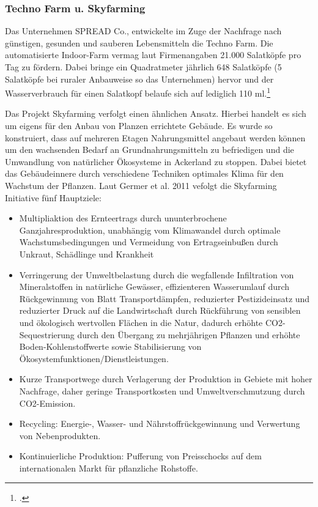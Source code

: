 \documentclass{scrartcl}
\begin{document}
\subsubsection{Techno Farm u. Skyfarming}

Das Unternehmen SPREAD Co., entwickelte im Zuge der Nachfrage nach günstigen, gesunden und sauberen Lebensmitteln die Techno Farm. Die automatisierte Indoor-Farm vermag laut Firmenangaben 21.000 Salatköpfe pro Tag zu fördern. Dabei bringe ein Quadratmeter jährlich 648 Salatköpfe (5 Salatköpfe bei ruraler Anbauweise so das Unternehmen) hervor und der Wasserverbrauch für einen Salatkopf belaufe sich auf lediglich 110 ml.\footcite[Vgl.]{TechnoFarm}

Das Projekt Skyfarming verfolgt einen ähnlichen Ansatz. Hierbei handelt es sich um eigens für den Anbau von Planzen errichtete Gebäude. Es wurde so konstruiert, dass auf mehreren Etagen Nahrungsmittel angebaut werden können um den wachsenden Bedarf an Grundnahrungsmitteln zu befriedigen und die Umwandlung von natürlicher Ökosysteme in Ackerland zu stoppen. Dabei bietet das Gebäudeinnere durch verschiedene Techniken optimales Klima für den Wachstum der Pflanzen. Laut Germer et al. 2011 vefolgt die Skyfarming Initiative fünf Hauptziele:

\begin{itemize}
    \item Multipliaktion des Ernteertrags durch ununterbrochene Ganzjahresproduktion, unabhängig vom Klimawandel durch optimale  Wachstumsbedingungen und Vermeidung von Ertragseinbußen durch Unkraut, Schädlinge und Krankheit
    \item Verringerung der Umweltbelastung durch die wegfallende Infiltration von Mineralstoffen in natürliche Gewässer, effizienteren Wasserumlauf durch Rückgewinnung von Blatt Transportdämpfen, reduzierter Pestizideinsatz und reduzierter Druck auf die Landwirtschaft durch Rückführung von sensiblen und ökologisch wertvollen Flächen in die Natur, dadurch erhöhte CO2-Sequestrierung durch den Übergang zu mehrjährigen Pflanzen und erhöhte Boden-Kohlenstoffwerte sowie Stabilisierung von Ökosystemfunktionen/Dienstleistungen.
    \item Kurze Transportwege durch Verlagerung der Produktion in Gebiete mit hoher Nachfrage, daher geringe Transportkosten und Umweltverschmutzung durch CO2-Emission.
    \item Recycling: Energie-, Wasser- und Nährstoffrückgewinnung und Verwertung von Nebenprodukten.
    \item Kontinuierliche Produktion: Pufferung von Preisschocks auf dem internationalen Markt für pflanzliche Rohstoffe. 

\end{itemize}
\end{document}
